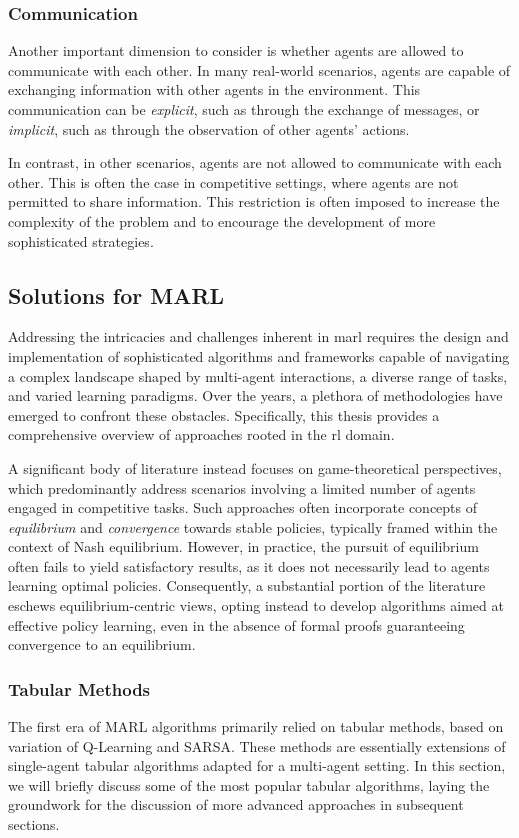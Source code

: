 \subsubsection{Communication}
Another important dimension to consider is whether agents are allowed to communicate with each other. 
 In many real-world scenarios, agents are capable of exchanging information with other agents in the environment. 
 This communication can be \emph{explicit}, 
 such as through the exchange of messages, or \emph{implicit}, 
 such as through the observation of other agents' actions. 

In contrast, in other scenarios, agents are not allowed to communicate with each other. 
 This is often the case in competitive settings, 
 where agents are not permitted to share information. 
 This restriction is often imposed to increase the complexity of the problem and to encourage the development of more sophisticated strategies.

\subsection{Solutions for MARL}
Addressing the intricacies and challenges inherent in \ac{marl} requires the design and implementation of sophisticated algorithms 
 and frameworks capable of navigating a complex landscape shaped by multi-agent interactions, 
 a diverse range of tasks, and varied learning paradigms. 
%
Over the years, a plethora of methodologies have emerged to confront these obstacles. 
 Specifically, this thesis provides a comprehensive overview of approaches rooted in the \ac{rl} domain.

A significant body of literature instead focuses on game-theoretical perspectives, 
 which predominantly address scenarios involving a limited number of agents engaged in competitive tasks. 
 Such approaches often incorporate concepts of \emph{equilibrium} and \emph{convergence} towards stable policies, 
 typically framed within the context of Nash equilibrium.
%
However, in practice, the pursuit of equilibrium often fails to yield satisfactory results, 
 as it does not necessarily lead to agents learning optimal policies. 
 Consequently, a substantial portion of the literature eschews equilibrium-centric views, 
 opting instead to develop algorithms aimed at effective policy learning, 
 even in the absence of formal proofs guaranteeing convergence to an equilibrium.

 \subsubsection{Tabular Methods}
The first era of \ac{MARL} 
 algorithms primarily relied on tabular methods, 
 based on variation of Q-Learning and SARSA. 
These methods are essentially extensions of single-agent tabular algorithms adapted for a multi-agent setting. 
In this section, we will briefly discuss some of the most popular tabular algorithms, 
 laying the groundwork for the discussion of more advanced approaches in subsequent sections.

